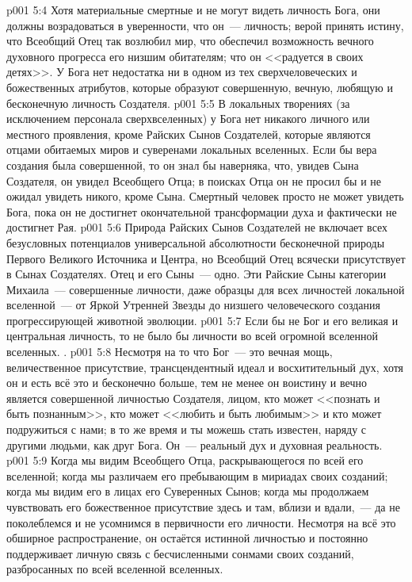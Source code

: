 \vs p001 5:4 Хотя материальные смертные и не могут видеть личность Бога, они должны возрадоваться в уверенности, что он~--- личность; верой принять истину, что Всеобщий Отец так возлюбил мир, что обеспечил возможность вечного духовного прогресса его низшим обитателям; что он <<радуется в своих детях>>. У Бога нет недостатка ни в одном из тех сверхчеловеческих и божественных атрибутов, которые образуют совершенную, вечную, любящую и бесконечную личность Создателя.
\vs p001 5:5 \pc В локальных творениях (за исключением персонала сверхвселенных) у Бога нет никакого личного или местного проявления, кроме Райских Сынов Создателей, которые являются отцами обитаемых миров и суверенами локальных вселенных. Если бы вера создания была совершенной, то он знал бы наверняка, что, увидев Сына Создателя, он увидел Всеобщего Отца; в поисках Отца он не просил бы и не ожидал увидеть никого, кроме Сына. Смертный человек просто не может увидеть Бога, пока он не достигнет окончательной трансформации духа и фактически не достигнет Рая.
\vs p001 5:6 Природа Райских Сынов Создателей не включает всех безусловных потенциалов универсальной абсолютности бесконечной природы Первого Великого Источника и Центра, но Всеобщий Отец  всячески присутствует в Сынах Создателях. Отец и его Сыны~--- одно. Эти Райские Сыны категории Михаила~--- совершенные личности, даже образцы для всех личностей локальной вселенной~--- от Яркой Утренней Звезды до низшего человеческого создания прогрессирующей животной эволюции.
\vs p001 5:7 \pc Если бы не Бог и его великая и центральная личность, то не было бы личности во всей огромной вселенной вселенных. .
\vs p001 5:8 \pc Несмотря на то что Бог~--- это вечная мощь, величественное присутствие, трансцендентный идеал и восхитительный дух, хотя он и есть всё это и бесконечно больше, тем не менее он воистину и вечно является совершенной личностью Создателя, лицом, кто может <<познать и быть познанным>>, кто может <<любить и быть любимым>> и кто может подружиться с нами; в то же время и ты можешь стать известен, наряду с другими людьми, как друг Бога. Он~--- реальный дух и духовная реальность.
\vs p001 5:9 Когда мы видим Всеобщего Отца, раскрывающегося по всей его вселенной; когда мы различаем его пребывающим в мириадах своих созданий; когда мы видим его в лицах его Суверенных Сынов; когда мы продолжаем чувствовать его божественное присутствие здесь и там, вблизи и вдали,~--- да не поколеблемся и не усомнимся в первичности его личности. Несмотря на всё это обширное распространение, он остаётся истинной личностью и постоянно поддерживает личную связь с бесчисленными сонмами своих созданий, разбросанных по всей вселенной вселенных.
